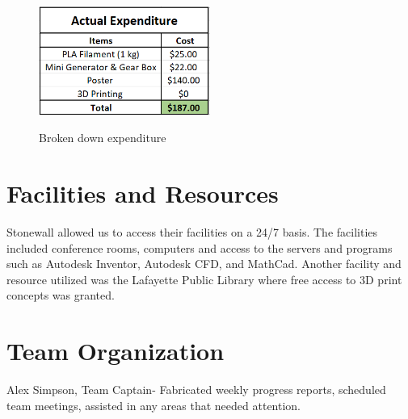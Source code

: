 \documentclass[12pt]{article}
\begin{document}
\begin{figure}[ht]
\begin{center}
\includegraphics[width=0.5\textwidth]{SPEND.PNG}
\label{budget}
\caption[p1] {Broken down expenditure}
\end{center}
\end{figure}
%
%
\vspace{-0.2in}
\section{Facilities and Resources}
\label{sec:resources}
\vspace{-0.2in}
\doublespacing

\hspace{0.5 in}Stonewall allowed us to access their facilities on a 24/7 basis.  The facilities included conference rooms, computers and access to the servers and programs such as Autodesk Inventor, Autodesk CFD, and MathCad. Another facility and resource utilized was the Lafayette Public Library where free access to 3D print concepts was granted.

%
%
\vspace{-0.2in}
\section{Team Organization}
\label{sec:organization}
\vspace{-0.2in}
\doublespacing
Alex Simpson, Team Captain- Fabricated weekly progress reports, scheduled team meetings, assisted in any areas that needed attention.
\end{document}
